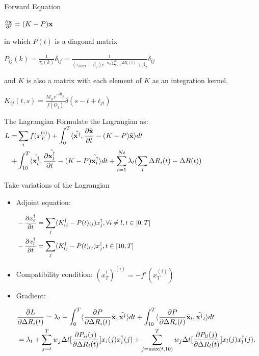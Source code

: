 \documentclass{beamer}
\newcommand{\pa}{\partial}
\newcommand{\xx}{{\bf x}}
\newcommand{\xd}{{\bf x}^{\dagger}}
\newcommand{\la}{\langle}
\newcommand{\ra}{\rangle}
\begin{document}
\begin{frame}{Forward Equation}
	\begin{block}{}
		\begin{center}
			 $\frac{\pa {\xx}}{\pa t} = (K-P)\xx  $ 
		\end{center}
		in which $P(t)$ is a diagonal matrix
		\begin{center}
			$P_{ij}(k) = \frac 1 {\tau_i(k)} \delta_{ij} = \frac{1}{(\tau_{start} - \beta_2)e^{-\alpha_2\sum_{t = 1}^{k}\Delta R_i(t)} + \beta_2}\delta_{ij}$
		\end{center}
	and $K$ is also a matrix with each element of $K$ as an integration kernel,
	\begin{center}
		$K_{ij}(t, s) = \frac{M_{ji}e^{-\beta t_{ji}}}{f(O_j)} \delta(s-t+t_{ji})$
	\end{center}
	\end{block}
\end{frame}

\begin{frame}{The Lagrangian}
	Formulate the Lagrangian as:
	$\begin{aligned}
		L = & \sum_{i} f(x^{(i)}_T) + \int_{0}^{T} \la\tilde{\xd}, \frac{\pa \tilde{\xx}}{\pa t} - (K - P)\tilde{\xx}\ra dt \\
		+  &\int_{10}^{T} \la\tilde{\xd_l}, \frac{\pa \tilde{\xd_l}}{\pa t} - (K - P)\tilde{\xd_l}\ra dt + \sum_{t=1}^{Nt}\lambda_t(\sum_{i}\Delta R_i(t) - \Delta R(t))
	 \end{aligned}$
	
\end{frame}

\begin{frame}{Take variations of the Lagrangian}
	\begin{itemize}
		\item Adjoint equation: 
		
			$\small \begin{aligned}
				& -\frac{\pa x_i^\dagger}{\pa t} = \sum_{j}(K^\dagger_{ij} - P(t)_{ij})x_j^\dagger, \forall i\not=l, t\in[0, T] \\
				& -\frac{\pa x_l^\dagger}{\pa t} = \sum_{j}(K^\dagger_{lj} - P(t)_{lj})x_j^\dagger, t\in[10, T]
			\end{aligned}$
		\item Compatibility condition: $(x^\dagger_T)^{(i)} = -f'(x_T^{(i)})$
		\item Gradient:
		
			{\small$\begin{aligned}
			&\frac{\pa L}{\pa \Delta R_i(t)} = \lambda_t + \int_{0}^{T} \la\frac{\pa P}{\pa \Delta R_i(t)}\tilde{\xx}, \tilde{\xd}\ra dt + \int_{10}^{T} \la\frac{\pa P}{\pa \Delta R_i(t)}\tilde{\xx}_l, \tilde{\xd}_l\ra dt \\
			&= \lambda_t + \sum_{j=t}^{T} w_j\Delta t[\frac{\pa P_{ii}(j)}{\pa \Delta R_i(t)}]x_i(j)x_i^\dagger(j) + \sum_{j=\max(t, 10)}^{T} w_j\Delta t[\frac{\pa P_{ll}(j)}{\pa \Delta R_l(t)}]x_l(j)x_l^\dagger(j).
			\end{aligned}$}
	\end{itemize}
\end{frame}
\end{document}
